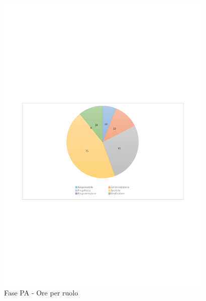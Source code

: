 \documentclass[../PianoProgetto.tex]{subfiles}
\begin{document}
	\begin{figure}[H]
		\centering
		\includegraphics[width=0.93\textwidth , trim=1.5cm 9cm 1.5cm 9cm]{grafici/PA/PA-ore-ruolo}
			\caption{Fase PA - Ore per ruolo}
		\label{fig:CircleChart-fasePA_ore_r}
	\end{figure}
\vfill	
\newpage
\vfill
\end{document}
